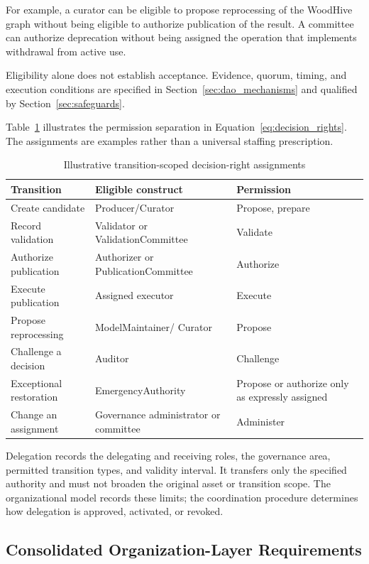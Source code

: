 \documentclass[journal]{IEEEtran}
\begin{document}
For example, a curator can be eligible to propose reprocessing
of the WoodHive graph without being eligible to authorize
publication of the result. A committee can authorize
deprecation without being assigned the operation that
implements withdrawal from active use.

Eligibility alone does not establish acceptance.
Evidence, quorum, timing, and execution conditions are
specified in Section~\ref{sec:dao_mechanisms} and qualified
by Section~\ref{sec:safeguards}.

Table~\ref{tab:decision_rights} illustrates the permission
separation in Equation~\ref{eq:decision_rights}. The assignments
are examples rather than a universal staffing prescription.

\begin{table}[t]
\caption{Illustrative transition-scoped decision-right assignments}
\label{tab:decision_rights}
\centering
\begin{tabular}{p{2.0cm}p{2.1cm}p{3.2cm}}
\hline
Transition & Eligible construct & Permission\\
\hline
Create candidate & Producer/\allowbreak Curator & Propose, prepare\\
Record validation & Validator or ValidationCommittee & Validate\\
Authorize publication & Authorizer or PublicationCommittee &
Authorize\\
Execute publication & Assigned executor & Execute\\
Propose reprocessing & Model\allowbreak Maintainer/ Curator & Propose\\
Challenge a decision & Auditor & Challenge\\
Exceptional restoration & Emergency\allowbreak Authority &
Propose or authorize only as expressly assigned\\
Change an assignment & Governance administrator or committee &
Administer\\
\hline
\end{tabular}
\end{table}

Delegation records the delegating and receiving roles,
the governance area, permitted transition types, and validity
interval. It transfers only the specified authority and must
not broaden the original asset or transition scope.
The organizational model records these limits; the coordination
procedure determines how delegation is approved, activated,
or revoked.

\subsection{Consolidated Organization-Layer Requirements}
\label{sec:constraints}
\end{document}
